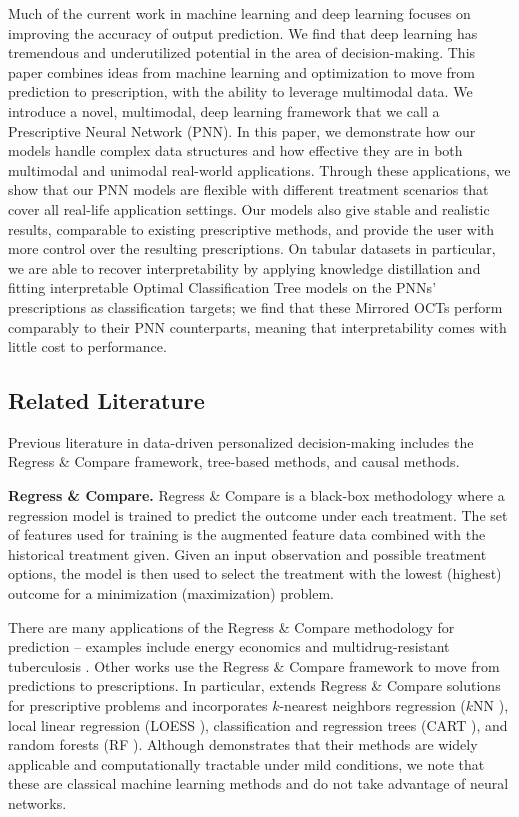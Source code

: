 \documentclass[10pt]{article} %
\begin{document}
Much of the current work in machine learning and deep learning focuses on improving the accuracy of output prediction. We find that deep learning has tremendous and underutilized potential in the area of decision-making. This paper combines ideas from machine learning and optimization to move from prediction to prescription, with the ability to leverage multimodal data. We introduce a novel, multimodal, deep learning framework that we call a Prescriptive Neural Network (PNN). In this paper, we demonstrate how our models handle complex data structures and how effective they are in both multimodal and unimodal real-world applications. Through these applications, we show that our PNN models are flexible with different treatment scenarios that cover all real-life application settings. Our models also give stable and realistic results, comparable to existing prescriptive methods, and provide the user with more control over the resulting prescriptions. On tabular datasets in particular, we are able to recover interpretability by applying knowledge distillation and fitting interpretable Optimal Classification Tree models \citep{optimal-classification-trees,MLbook} on the PNNs' prescriptions as classification targets; we find that these Mirrored OCTs perform comparably to their PNN counterparts, meaning that interpretability comes with little cost to performance. 

\subsection{Related Literature}\label{subsec:related-literature}
Previous literature in data-driven personalized decision-making includes the Regress \& Compare framework, tree-based methods, and causal methods. 

\textbf{Regress \& Compare.} 
Regress \& Compare is a black-box methodology where a regression model is trained to predict the outcome under each treatment. The set of features used for training is the augmented feature data combined with the historical treatment given. Given an input observation and possible treatment options, the model is then used to select the treatment with the lowest (highest) outcome for a minimization (maximization) problem. 

There are many applications of the Regress \& Compare methodology for prediction -- examples include energy economics \citep{electricity-markets} and multidrug-resistant tuberculosis \citep{tuberculosis-causal-inference}. Other works use the Regress \& Compare framework to move from predictions to prescriptions. In particular, \citet{predictive-to-prescriptive-analytics} extends Regress \& Compare solutions for prescriptive problems and incorporates $k$-nearest neighbors regression ($k$NN \citet{knn}), local linear regression (LOESS \citet{loess}), classification and regression trees (CART \citet{cart}), and random forests (RF \citet{rf}). Although \citet{predictive-to-prescriptive-analytics} demonstrates that their methods are widely applicable and computationally tractable under mild conditions, we note that these are classical machine learning methods and do not take advantage of neural networks. 
\end{document}
